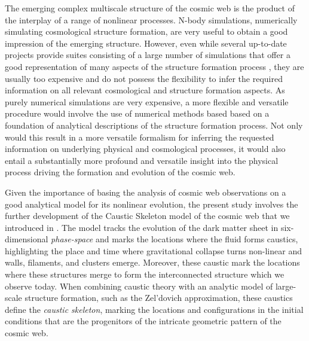 \documentclass[a4paper, 11pt]{article}
\begin{document}
The emerging complex multiscale structure of the cosmic web is the product of the interplay of a range of nonlinear processes.
N-body simulations, numerically simulating cosmological structure formation, are very useful to obtain a good impression of the
emerging structure. However, even while several up-to-date projects provide suites consisting of a large number of simulations
that offer a good representation of many aspects of the structure formation process \citep{Abacussummit,Quijote}, they are usually
  too expensive and do not possess the flexibility to infer the required information on all relevant cosmological and
  structure formation aspects. As purely numerical simulations are very expensive, a more flexible and versatile procedure
  would involve the use of numerical methods based based on a foundation of analytical descriptions of the structure formation
  process. Not only would this result in a more versatile formalism for inferring the requested information on underlying
  physical and cosmological processes, it would also entail a substantially more profound and versatile insight into
  the physical process driving the formation and evolution of the cosmic web.

  
  Given the importance of basing the analysis of cosmic web observations on a good analytical model for its
  nonlinear evolution, the present study involves the further development of the Caustic Skeleton model
  of the cosmic web that we introduced in \citep{feldbrugge2018}. The model tracks the evolution of the dark matter sheet
  in six-dimensional \textit{phase-space} and marks the locations where the fluid forms caustics, highlighting the place and
  time where gravitational collapse turns non-linear and walls, filaments, and clusters emerge. Moreover, these caustic mark the
  locations where these structures merge to form the interconnected structure which we observe today. When combining caustic theory
  with an analytic model of large-scale structure formation, such as the Zel'dovich approximation, these caustics define the
  \textit{caustic skeleton}, marking the locations and configurations in the initial conditions that are the progenitors of the
  intricate geometric pattern of the cosmic web. 
\end{document}
